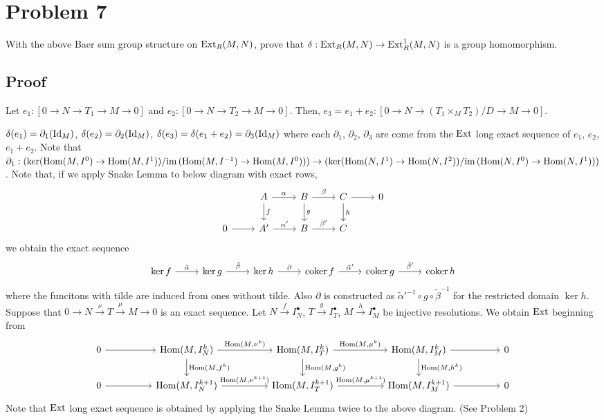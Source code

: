 \section*{Problem 7}

With the above Baer sum group structure on \(\textnormal{Ext}_R(M, N)\),
prove that \(\delta: \textnormal{Ext}_R(M, N) \to \textnormal{Ext}_R^1(M, N)\) is a group homomorphism.

\subsection*{Proof}

Let
\(e_1: [0 \to N \to T_1 \to M \to 0]\)
and
\(e_2: [0 \to N \to T_2 \to M \to 0]\).
Then,
\(e_3 = e_1 + e_2: [0 \to N \to (T_1 \times_M T_2) / D \to M \to 0]\).

\(\delta(e_1) = \partial_1(\textnormal{Id}_M)\),
\(\delta(e_2) = \partial_2(\textnormal{Id}_M)\),
\(\delta(e_3) = \delta(e_1 + e_2) = \partial_3(\textnormal{Id}_M)\)
where each \(\partial_1\), \(\partial_2\), \(\partial_3\) are come from the \(\textnormal{Ext}\) long exact sequence of \(e_1\), \(e_2\), \(e_1 + e_2\).
\br
\noindent
Note that
\(\partial_1:
  (\ker (\textnormal{Hom}(M, I^{0}) \to \textnormal{Hom}(M, I^{1}))
        /
   \textnormal{im}\, (\textnormal{Hom}(M, I^{-1}) \to \textnormal{Hom}(M, I^{0}))
        )
  \to
  (\ker (\textnormal{Hom}(N, I^{1}) \to \textnormal{Hom}(N, I^{2}))
        /
   \textnormal{im}\, (\textnormal{Hom}(N, I^{0}) \to \textnormal{Hom}(N, I^{1}))
        )
\).
\br
\noindent
Note that, if we apply Snake Lemma to below diagram with exact rows,
\[\begin{tikzcd}
  & A \ar["f"]{d} \ar["\alpha"]{r} & B \ar["g"]{d} \ar["\beta"]{r} & C \ar["h"]{d} \ar{r} & 0 \\
  0 \ar{r} & A' \ar["\alpha'"]{r} & B \ar["\beta'"]{r} & C &
\end{tikzcd}\]
we obtain the exact sequence
\[\begin{tikzcd}
\ker f \ar["\tilde\alpha"]{r} & \ker g \ar["\tilde\beta"]{r} & \ker h \ar["\partial"]{r} & \coker f \ar["\tilde\alpha'"]{r} & \coker g \ar["\tilde\beta'"]{r} & \coker h
\end{tikzcd}\]
where the funcitons with tilde are induced from ones without tilde.
Also \(\partial\) is constructed as \(\tilde\alpha'^{-1} \circ g \circ \tilde\beta^{-1}\) for the restricted domain \(\ker h\).
\br
\noindent
Suppose that
\(0 \to N \xrightarrow{\nu} T \xrightarrow{\mu} M \to 0\)
is an exact sequence.
Let
\(N \xrightarrow{f} I_N^\bullet\),
\(T \xrightarrow{g} I_T^\bullet\),
\(M \xrightarrow{h} I_M^\bullet\)
be injective resolutions.
We obtain \(\textnormal{Ext}\) beginning from
\[\begin{tikzcd}[column sep=huge]
  0 \ar{r} & \Hom(M, I_N^k) \ar["\Hom(M{,}f^k)"]{d} \ar["\Hom(M{,}\nu^k)"]{r} & \Hom(M, I_T^k) \ar["\Hom(M{,}g^k)"]{d} \ar["\Hom(M{,}\mu^k)"]{r} & \Hom(M, I_M^k) \ar["\Hom(M{,}h^k)"]{d} \ar{r} & 0 \\
  0 \ar{r} & \Hom(M, I_N^{k+1}) \ar["\Hom(M{,}\nu^{k+1})"]{r} & \Hom(M, I_T^{k+1}) \ar["\Hom(M{,}\mu^{k+1})"]{r} & \Hom(M, I_M^{k+1}) \ar{r} & 0
\end{tikzcd}\]
Note that \(\textnormal{Ext}\) long exact sequence is obtained by applying
the Snake Lemma twice to the above diagram. (See Problem 2)

